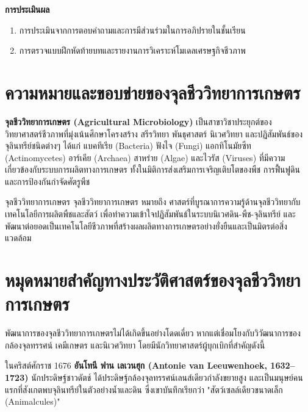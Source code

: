 \noindent\textbf{การประเมินผล}
\begin{enumerate}
    \item การประเมินจากการตอบคำถามและการมีส่วนร่วมในการอภิปรายในชั้นเรียน
    \item การตรวจแบบฝึกหัดท้ายบทและรายงานการวิเคราะห์โมเดลเศรษฐกิจชีวภาพ
\end{enumerate}

\newpage


\section{ความหมายและขอบข่ายของจุลชีววิทยาการเกษตร}

\textbf{จุลชีววิทยาการเกษตร (Agricultural Microbiology)} เป็นสาขาวิชาประยุกต์ของวิทยาศาสตร์ชีวภาพที่มุ่งเน้นศึกษาโครงสร้าง สรีรวิทยา พันธุศาสตร์ นิเวศวิทยา และปฏิสัมพันธ์ของจุลินทรีย์ชนิดต่างๆ ได้แก่ แบคทีเรีย (Bacteria) ฟังไจ (Fungi) แอกทิโนมัยซีท (Actinomycetes) อาร์เคีย (Archaea) สาหร่าย (Algae) และไวรัส (Viruses) ที่มีความเกี่ยวข้องกับระบบการผลิตทางการเกษตร ทั้งในมิติการส่งเสริมการเจริญเติบโตของพืช การฟื้นฟูดิน และการป้องกันกำจัดศัตรูพืช

\begin{definitionbox}{จุลชีววิทยาการเกษตร}
จุลชีววิทยาการเกษตร หมายถึง ศาสตร์ที่บูรณาการความรู้ด้านจุลชีววิทยากับเทคโนโลยีการผลิตพืชและสัตว์ เพื่อทำความเข้าใจปฏิสัมพันธ์ในระบบนิเวศดิน-พืช-จุลินทรีย์ และพัฒนาต่อยอดเป็นเทคโนโลยีชีวภาพที่สร้างผลผลิตทางการเกษตรอย่างยั่งยืนและเป็นมิตรต่อสิ่งแวดล้อม
\end{definitionbox}

\section{หมุดหมายสำคัญทางประวัติศาสตร์ของจุลชีววิทยาการเกษตร}

พัฒนาการของจุลชีววิทยาการเกษตรไม่ได้เกิดขึ้นอย่างโดดเดี่ยว หากแต่เชื่อมโยงกับวิวัฒนาการของกล้องจุลทรรศน์ เคมีเกษตร และนิเวศวิทยา โดยมีนักวิทยาศาสตร์ผู้บุกเบิกที่สำคัญดังนี้

ในคริสต์ศักราช 1676 \textbf{อันโทนี ฟาน เลเวนฮุก (Antonie van Leeuwenhoek, 1632--1723)} นักประดิษฐ์ชาวดัตช์ ได้ประดิษฐ์กล้องจุลทรรศน์เลนส์เดียวกำลังขยายสูง และเป็นมนุษย์คนแรกที่สังเกตพบจุลินทรีย์ในตัวอย่างน้ำและดิน ซึ่งเขาบันทึกเรียกว่า "สัตว์เซลล์เดียวขนาดเล็ก (Animalcules)"

